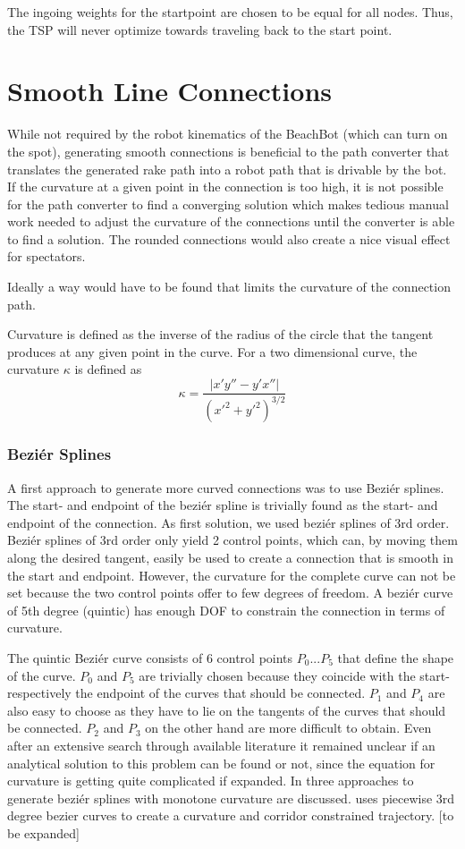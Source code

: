 The ingoing weights for the startpoint are chosen to be equal for all nodes. Thus, the TSP will never optimize towards traveling back to the start point.

\section{Smooth Line Connections}

While not required by the robot kinematics of the BeachBot (which can turn on the spot), generating smooth connections is beneficial to the path converter that translates the generated rake path into a robot path that is drivable by the bot. If the curvature at a given point in the connection is too high, it is not possible for the path converter to find a converging solution which makes tedious manual work needed to adjust the curvature of the connections until the converter is able to find a solution. The rounded connections would also create a nice visual effect for spectators.

Ideally a way would have to be found that limits the curvature of the connection path.

Curvature is defined as the inverse of the radius of the circle that the tangent produces at any given point in the curve. For a two dimensional curve, the curvature $\kappa$ is defined as 
$$\kappa = \frac{|x'y''-y'x''|}{(x'^2+y'^2)^{3/2}}$$


\subsubsection{Beziér Splines}

A first approach to generate more curved connections was to use Beziér splines.
The start- and endpoint of the beziér spline is trivially found as the start- and endpoint of the connection. As first solution, we used beziér splines of 3rd order. Beziér splines of 3rd order only yield 2 control points, which can, by moving them along the desired tangent, easily be used to create a connection that is smooth in the start and endpoint. However, the curvature for the complete curve can not be set because the two control points offer to few degrees of freedom. A beziér curve of 5th degree (quintic) has enough DOF to constrain the connection in terms of curvature.

The quintic Beziér curve consists of 6 control points $P_0 ... P_5$ that define the shape of the curve. $P_0$ and $P_5$ are trivially chosen because they coincide with the start- respectively the endpoint of the curves that should be connected. $P_1$ and $P_4$ are also easy to choose as they have to lie on the tangents of the curves that should be connected. $P_2$ and $P_3$ on the other hand are more difficult to obtain. Even after an extensive search through available literature it remained unclear if an analytical solution to this problem can be found or not, since the equation for curvature is getting quite complicated if expanded. In \cite{doi:10.1137/1.9781611971521.ch5} three approaches to generate beziér splines with monotone curvature are discussed. \cite{choi2010piecewise} uses piecewise 3rd degree bezier curves to create a curvature and corridor constrained trajectory.  [to be expanded]

